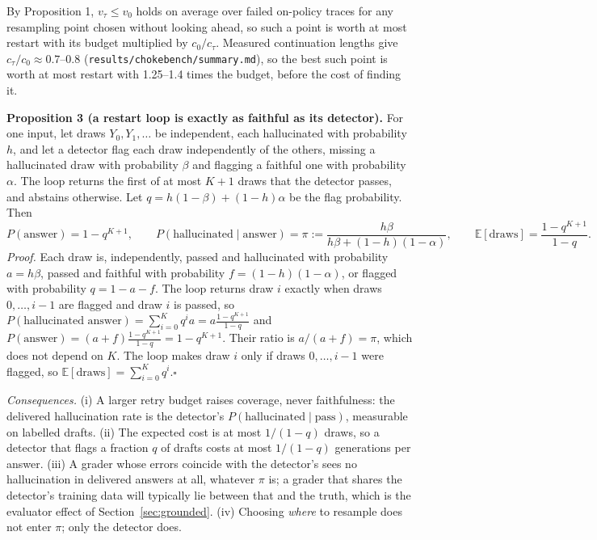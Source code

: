 By Proposition 1, $v_\tau\le v_0$ holds on average over failed on-policy traces for any resampling
point chosen without looking ahead, so such a point is worth at most restart with its budget
multiplied by $c_0/c_\tau$. Measured continuation lengths give $c_\tau/c_0\approx0.7$--$0.8$
(\texttt{results/chokebench/summary.md}), so the best such point is worth at most restart with 1.25--1.4 times the
budget, before the cost of finding it.

\textbf{Proposition 3 (a restart loop is exactly as faithful as its detector).}
For one input, let draws $Y_0,Y_1,\dots$ be independent, each hallucinated with probability $h$, and
let a detector flag each draw independently of the others, missing a hallucinated draw with
probability $\beta$ and flagging a faithful one with probability $\alpha$. The loop returns the first
of at most $K+1$ draws that the detector passes, and abstains otherwise. Let
$q=h(1-\beta)+(1-h)\alpha$ be the flag probability. Then
\[P(\text{answer})=1-q^{K+1},\qquad
P(\text{hallucinated}\mid\text{answer})=\pi:=\frac{h\beta}{h\beta+(1-h)(1-\alpha)},\qquad
\mathbb{E}[\text{draws}]=\frac{1-q^{K+1}}{1-q}.\]
\emph{Proof.} Each draw is, independently, passed and hallucinated with probability $a=h\beta$,
passed and faithful with probability $f=(1-h)(1-\alpha)$, or flagged with probability $q=1-a-f$. The
loop returns draw $i$ exactly when draws $0,\dots,i-1$ are flagged and draw $i$ is passed, so
$P(\text{hallucinated answer})=\sum_{i=0}^{K}q^ia=a\frac{1-q^{K+1}}{1-q}$ and
$P(\text{answer})=(a+f)\frac{1-q^{K+1}}{1-q}=1-q^{K+1}$. Their ratio is $a/(a+f)=\pi$, which does not
depend on $K$. The loop makes draw $i$ only if draws $0,\dots,i-1$ were flagged, so
$\mathbb{E}[\text{draws}]=\sum_{i=0}^{K}q^i$.\hfill$\square$

\emph{Consequences.} (i) A larger retry budget raises coverage, never faithfulness: the delivered
hallucination rate is the detector's $P(\text{hallucinated}\mid\text{pass})$, measurable on labelled
drafts. (ii) The expected cost is at most $1/(1-q)$ draws, so a detector that flags a fraction $q$ of
drafts costs at most $1/(1-q)$ generations per answer. (iii) A grader whose errors coincide with the
detector's sees no hallucination in delivered answers at all, whatever $\pi$ is; a grader that shares the detector's training data will typically lie between that and the truth, which is the evaluator effect of
Section~\ref{sec:grounded}. (iv) Choosing \emph{where} to resample does not enter $\pi$; only the
detector does.
